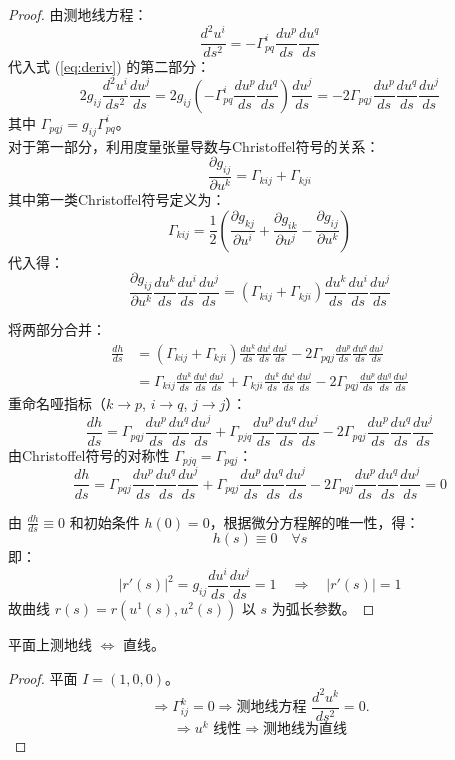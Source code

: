 \documentclass[lang=cn,10pt,thmcnt=section]{elegantbook}
\begin{document}
\begin{proof}
由测地线方程：
\[
\frac{d^2 u^i}{ds^2} = -\Gamma_{pq}^i \frac{du^p}{ds} \frac{du^q}{ds}
\]
代入式 (\ref{eq:deriv}) 的第二部分：
\[
2g_{ij} \frac{d^2 u^i}{ds^2} \frac{du^j}{ds} = 2g_{ij}\left( -\Gamma_{pq}^i \frac{du^p}{ds} \frac{du^q}{ds} \right) \frac{du^j}{ds} = -2\Gamma_{pqj} \frac{du^p}{ds} \frac{du^q}{ds} \frac{du^j}{ds}
\]
其中 \( \Gamma_{pqj} = g_{ij}\Gamma_{pq}^i \)。\\
对于第一部分，利用度量张量导数与Christoffel符号的关系：
\[
\frac{\partial g_{ij}}{\partial u^k} = \Gamma_{kij} + \Gamma_{kji}
\]
其中第一类Christoffel符号定义为：
\[
\Gamma_{kij} = \frac{1}{2}\left( \frac{\partial g_{kj}}{\partial u^i} + \frac{\partial g_{ik}}{\partial u^j} - \frac{\partial g_{ij}}{\partial u^k} \right)
\]
代入得：
\[
\frac{\partial g_{ij}}{\partial u^k} \frac{du^k}{ds} \frac{du^i}{ds} \frac{du^j}{ds} = (\Gamma_{kij} + \Gamma_{kji}) \frac{du^k}{ds} \frac{du^i}{ds} \frac{du^j}{ds}
\]

将两部分合并：
\begin{align*}
\frac{dh}{ds} &= (\Gamma_{kij} + \Gamma_{kji}) \frac{du^k}{ds} \frac{du^i}{ds} \frac{du^j}{ds} - 2\Gamma_{pqj} \frac{du^p}{ds} \frac{du^q}{ds} \frac{du^j}{ds} \\
&= \Gamma_{kij} \frac{du^k}{ds} \frac{du^i}{ds} \frac{du^j}{ds} + \Gamma_{kji} \frac{du^k}{ds} \frac{du^i}{ds} \frac{du^j}{ds} - 2\Gamma_{pqj} \frac{du^p}{ds} \frac{du^q}{ds} \frac{du^j}{ds}
\end{align*}
重命名哑指标（\( k \to p \), \( i \to q \), \( j \to j \)）：
\[
\frac{dh}{ds} = \Gamma_{pqj} \frac{du^p}{ds} \frac{du^q}{ds} \frac{du^j}{ds} + \Gamma_{pjq} \frac{du^p}{ds} \frac{du^q}{ds} \frac{du^j}{ds} - 2\Gamma_{pqj} \frac{du^p}{ds} \frac{du^q}{ds} \frac{du^j}{ds}
\]
由Christoffel符号的对称性 \( \Gamma_{pjq} = \Gamma_{pqj} \)：
\[
\frac{dh}{ds} = \Gamma_{pqj} \frac{du^p}{ds} \frac{du^q}{ds} \frac{du^j}{ds} + \Gamma_{pqj} \frac{du^p}{ds} \frac{du^q}{ds} \frac{du^j}{ds} - 2\Gamma_{pqj} \frac{du^p}{ds} \frac{du^q}{ds} \frac{du^j}{ds} = 0
\]


由 \( \frac{dh}{ds} \equiv 0 \) 和初始条件 \( h(0) = 0 \)，根据微分方程解的唯一性，得：
\[
h(s) \equiv 0 \quad \forall s
\]
即：
\[
|r'(s)|^2 = g_{ij} \frac{du^i}{ds} \frac{du^j}{ds} = 1 \quad \Rightarrow \quad |r'(s)| = 1
\]
故曲线 \( r(s) = r(u^1(s), u^2(s)) \) 以 \( s \) 为弧长参数。

\end{proof}
\begin{proposition}
    平面上测地线 \(\Leftrightarrow\) 直线。
\end{proposition}
\begin{proof}
    平面 \( I = (1, 0, 0) \)。
\[
\Rightarrow \Gamma^k_{ij} = 0 \Rightarrow \text{测地线方程 } \frac{d^2 u^k}{ds^2} = 0.
\]
\[
\Rightarrow u^k \text{ 线性} \Rightarrow \text{测地线为直线} 
\]
\end{proof}
\end{document}
